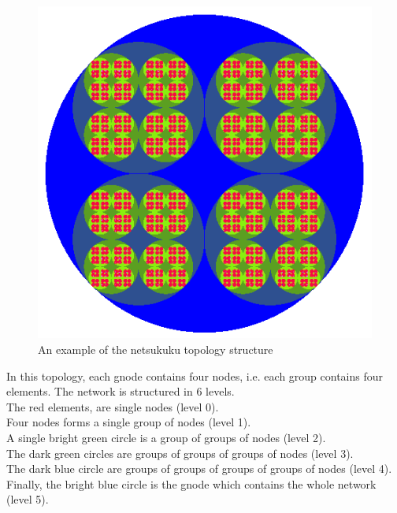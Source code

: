 \documentclass[a4paper]{article}
\begin{document}
\begin{figure}[h]
	\begin{center}
		\includegraphics[scale=0.5]{fig/fractal_circle}
	\end{center}
	\caption{An example of the netsukuku topology structure}
	\label{fig:fract_circle}
\end{figure}

In this topology, each gnode contains four nodes, i.e. each group contains
four elements. The network is structured in 6 levels.\\
The red elements, are single nodes (level 0).\\
Four nodes forms a single group of nodes (level 1).\\
A single bright green circle is a 
				  group of groups of nodes (level 2).\\
The dark green circles are        groups of groups of groups of nodes (level 3).\\
The dark blue circle are          groups of groups of groups of groups of
nodes (level 4). \\
Finally, the bright blue circle is the gnode which contains the whole network
(level 5).
\end{document}
